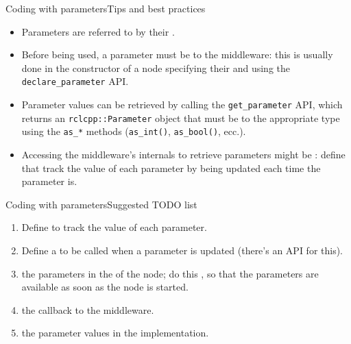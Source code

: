 \begin{frame}{Coding with parameters}{Tips and best practices}
	\begin{itemize}
		\item Parameters are referred to by their .
		\item Before being used, a parameter must be  to the middleware: this is usually done in the constructor of a node specifying their  and  using the \texttt{declare\_parameter} API.
		\item Parameter values can be retrieved  by calling the \texttt{get\_parameter} API, which returns an \texttt{rclcpp::Parameter} object that must be  to the appropriate type using the \texttt{as\_*} methods (\texttt{as\_int()}, \texttt{as\_bool()}, ecc.).
    \item Accessing the middleware's internals to retrieve parameters might be : define  that track the value of each parameter by being updated each time the parameter is.
	\end{itemize}
\end{frame}
\begin{frame}{Coding with parameters}{Suggested TODO list}
  \begin{enumerate}
    \item Define  to track the value of each parameter.
    \item Define a  to be called when a parameter is updated (there's an API for this).
    \item {} the parameters in the  of the node; do this , so that the parameters are available as soon as the node is started.
    \item {} the callback to the middleware.
    \item {} the parameter values in the implementation.
  \end{enumerate}
\end{frame}
